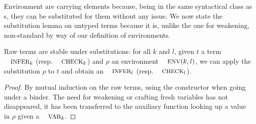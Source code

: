 \documentclass[a4paper,UKenglish]{lipics-v2016}
\begin{document}
Environment are carrying \Inferable{} elements because, being in the
same syntactical class as \Var{}s, they can be substituted for them
without any issue. We now state the substitution lemma on untyped terms
because it is, unlike the one for weakening, non-standard by way of our
definition of environments.

\begin{lemma}Raw terms are stable under substitutions: for all $k$ and
$l$, given $t$ a term $\Inferable{k}$ (resp. $\Checkable{k}$) and $ρ$
an environment $\Env{}(k,l)$, we can apply the substitution $ρ$ to $t$
and obtain an $\Inferable{l}$ (resp. $\Checkable{l}$).
\end{lemma}
\begin{proof}By mutual induction on the raw terms, using the \envextend{}
\Env{} constructor when going under a binder. The need for weakening or
crafting fresh variables has not disappeared, it has been transferred to
the auxiliary function looking up a value in $ρ$ given a $\Var{k}$.
\end{proof}
\end{document}
